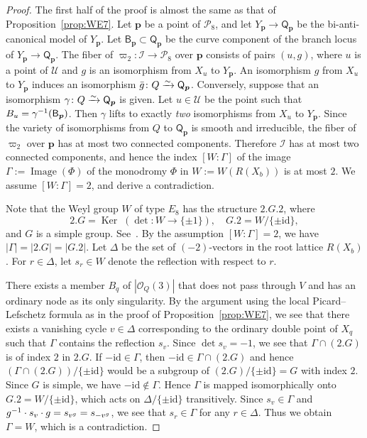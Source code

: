 \documentclass{math}
\theoremstyle{plain}
\numberwithin{equation}{section}
\newcommand{\III}{\mathord{\mathcal I}}
\newcommand{\OOO}{\mathord{\mathcal O}}
\newcommand{\PPP}{\mathord{\mathcal P}}
\newcommand{\UUU}{\mathord{\mathcal U}}
\newcommand{\isom}{\xrightarrow{\raise -3pt \hbox{\scriptsize $\sim$} }}
\newcommand{\inv}{\sp{-1}}
\DeclareMathOperator{\Image}{Image}
\DeclareMathOperator{\Ker}{Ker}
\newcommand{\id}{\mathord{\mathrm{id}}}
\newcommand{\mon}{\Phi}
\newcommand{\bp}{\bm{p}}
\newcommand{\sfB}{\mathsf{B}}
\newcommand{\sfQ}{\mathsf{Q}}
\begin{document}
\begin{proof}
The first half of the proof is almost the same as that of Proposition~\ref{prop:WE7}.
Let $\bp$ be a point of $\PPP_8$, 
and let $Y_{\bp} \to {\sfQ}_{\bp}$ 
be the bi-anti-canonical model of $Y_{\bp}$.
Let $\sfB_{\bp}\subset {\sfQ}_{\bp}$ be the curve component of the branch locus  of $Y_{\bp} \to {\sfQ}_{\bp}$.
The fiber of $\varpi_2\colon \III\to \PPP_8$ 
over $\bp$ consists 
of pairs $(u, g)$,
where $u$ is a point of $\UUU$
and $g$ is an isomorphism from $X_u$ to $Y_{\bp}$.
An isomorphism $g$ from $X_u$ to $Y_{\bp}$
induces an isomorphism $\bar{g}\colon Q \isom {\sfQ}_{\bp}$.
Conversely,
suppose that an isomorphism 
$\gamma\colon Q \isom {\sfQ}_{\bp}$ is given.
Let $u\in \UUU$ be the point such that $B_{u}=\gamma\inv(\sfB_{\bp})$.
Then $\gamma$ lifts to exactly \emph{two} isomorphisms 
from $X_u$ to $Y_{\bp}$.
Since the variety 
of isomorphisms from $Q $ to ${\sfQ}_{\bp}$
is smooth and irreducible, 
 the fiber of $\varpi_2$ 
over $\bp$ has at most two connected components.
Therefore  $\III$  has at most two connected components,
and hence 
the index $[W: \Gamma]$ of the image
$\Gamma:=\Image(\mon)$ of the monodromy $\mon$ 
in $W:=W(R(X_b))$  is at most $2$.
We assume 
$[W: \Gamma]=2$, 
and derive a contradiction.
\par
Note  that the Weyl group $W$ of type $E_8$ has the  structure $2.G.2$,
where 
\[
2.G=\Ker\; (\det \colon W\to \{\pm 1\}),
\quad 
G.2=W/\{\pm \id\}, 
\]
and $G$ is a simple group. 
See~\cite[page 85]{ATLAS1985}.
By the assumption $[W: \Gamma]=2$,
we have $|\Gamma|=|2.G|=|G.2|$.
Let $\Delta$ be the set of $(-2)$-vectors 
in the root lattice $R(X_b)$. 
For $r\in \Delta$,
let $s_r\in W$ denote the reflection with respect to $r$.
\par
There exists a member $B_q$  of $|\OOO_{Q}(3)|$
that does not pass through $V$ and  has an ordinary node as its only singularity.
By the argument using the local Picard--Lefschetz formula
as in the proof of Proposition~\ref{prop:WE7},
we see that there exists a vanishing cycle
$v\in \Delta$ corresponding to the ordinary double point of $X_q$
such that $\Gamma$ contains the reflection $s_v$.
Since $\det s_v=-1$,
we see that $\Gamma\cap (2.G)$ is of index $2$ in $2.G$.
If $-\id \in \Gamma$, then $-\id\in \Gamma\cap (2.G)$ 
and hence $(\Gamma\cap (2.G))/\{\pm\id\}$ would be a  subgroup of $(2.G)/\{\pm\id\}=G$ with index $2$.
Since $G$ is simple, we have  $-\id \notin \Gamma$.
Hence $\Gamma$ is mapped isomorphically  onto $G.2=W/\{\pm \id\}$,
which acts on $\Delta/\{\pm \id\}$ transitively.
Since $s_v\in \Gamma$ and $g\inv\cdot s_v\cdot g=s_{v^g}=s_{-v^g}$, 
we see that $s_r\in \Gamma$  for any $r\in \Delta$.
Thus we obtain $\Gamma=W$,
which is a contradiction.
%
%
\end{proof}
\end{document}
